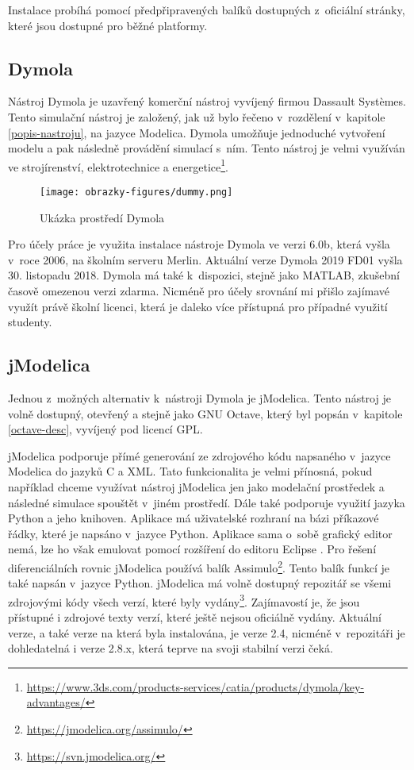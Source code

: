 Instalace probíhá pomocí předpřipravených balíků dostupných z~oficiální stránky, které jsou dostupné pro běžné platformy.

\subsection{Dymola}
\label{dymola-desc}

Nástroj Dymola je uzavřený komerční nástroj vyvíjený firmou Dassault Systèmes. Tento simulační nástroj je založený, jak už bylo řečeno v~rozdělení v~kapitole \ref{popis-nastroju}, na jazyce Modelica. Dymola umožňuje jednoduché vytvoření modelu a pak následně provádění simulací s~ním. Tento nástroj je velmi využíván ve strojírenství, elektrotechnice a energetice\footnote{\url{https://www.3ds.com/products-services/catia/products/dymola/key-advantages/}}.

\begin{figure}[ht]
    \centering
    \texttt{[image: obrazky-figures/dummy.png]}
    \caption{Ukázka prostředí Dymola}
    \label{fig:dymola}
\end{figure}

Pro účely práce je využita instalace nástroje Dymola ve verzi 6.0b, která vyšla v~roce 2006, na školním serveru Merlin. Aktuální verze Dymola 2019 FD01 vyšla 30. listopadu 2018. Dymola má také k~dispozici, stejně jako MATLAB, zkušební časově omezenou verzi zdarma. Nicméně pro účely srovnání mi přišlo zajímavé využít právě školní licenci, která je daleko více přístupná pro případné využití studenty.


\subsection{jModelica}
\label{jmodelica}
Jednou z~možných alternativ k~nástroji Dymola je jModelica. Tento nástroj je volně dostupný, otevřený a stejně jako GNU Octave, který byl popsán v~kapitole \ref{octave-desc}, vyvíjený pod licencí GPL.  

jModelica podporuje přímé generování ze zdrojového kódu napsaného v~jazyce Modelica do jazyků C a XML. Tato funkcionalita je velmi přínosná, pokud například chceme využívat nástroj jModelica jen jako modelační prostředek a následné simulace spouštět v~jiném prostředí. Dále také podporuje využití jazyka Python a jeho knihoven. Aplikace má uživatelské rozhraní na bázi příkazové řádky, které je napsáno v~jazyce Python. Aplikace sama o~sobě grafický editor nemá, lze ho však emulovat pomocí rozšíření do editoru Eclipse \cite{modelica-example}. Pro řešení diferenciálních rovnic jModelica používá balík Assimulo\footnote{\url{https://jmodelica.org/assimulo/}}. Tento balík funkcí je také napsán v~jazyce Python. 
jModelica má volně dostupný repozitář se všemi zdrojovými kódy všech verzí, které byly vydány\footnote{\url{https://svn.jmodelica.org/}}. Zajímavostí je, že jsou přístupné i zdrojové texty verzí, které ještě nejsou oficiálně vydány. Aktuální verze, a také verze na která byla instalována, je verze 2.4, nicméně v~repozitáři je dohledatelná i verze 2.8.x, která teprve na svoji stabilní verzi čeká.

